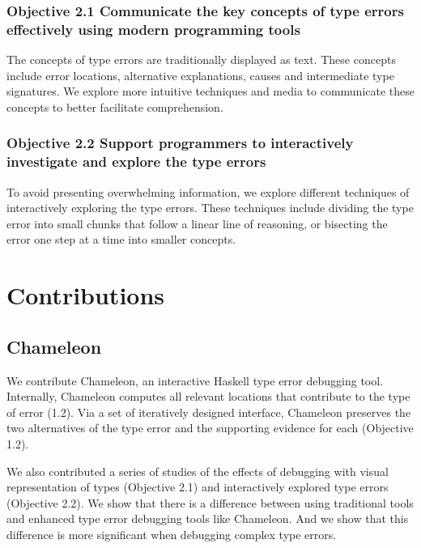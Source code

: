 \subsubsection{Objective 2.1 Communicate the key concepts of type errors effectively using modern programming tools}

The concepts of type errors are traditionally displayed as text. These concepts include error locations, alternative explanations, causes and intermediate type signatures. We explore more intuitive techniques and media to communicate these concepts to better facilitate comprehension.

\subsubsection{Objective 2.2 Support programmers to interactively investigate and explore the type errors}

To avoid presenting overwhelming information, we explore different techniques of interactively exploring the type errors. These techniques include dividing the type error into small chunks that follow a linear line of reasoning, or bisecting the error one step at a time into smaller concepts.

\section{Contributions}

\subsection{Chameleon}

We contribute Chameleon, an interactive Haskell type error debugging tool. Internally, Chameleon computes all relevant locations that contribute to the type of error (1.2). Via a set of iteratively designed interface, Chameleon preserves the two alternatives of the type error and the supporting evidence for each (Objective 1.2).


We also contributed a series of studies of the effects of debugging with visual representation of types (Objective 2.1) and interactively explored type errors (Objective 2.2). We show that there is a difference between using traditional tools and enhanced type error debugging tools like Chameleon. And we show that this difference is more significant when debugging complex type errors.

